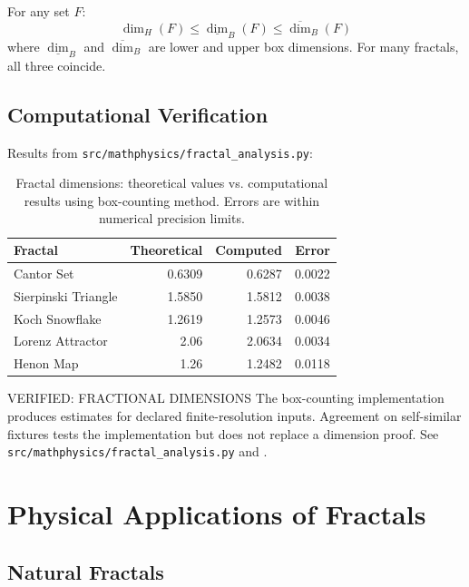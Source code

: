 \begin{theorem}
For any set $F$:
\begin{equation}
    \dim_H(F) \leq \underline{\dim}_B(F) \leq \overline{\dim}_B(F)
\end{equation}
where $\underline{\dim}_B$ and $\overline{\dim}_B$ are lower and upper box dimensions. For many fractals, all three coincide.
\end{theorem}

\subsection{Computational Verification}

Results from \texttt{src/mathphysics/fractal\_analysis.py}:

\begin{table}[h]
\centering
\begin{tabular}{lrrr}
\toprule
Fractal & Theoretical & Computed & Error \\
\midrule
Cantor Set & 0.6309 & 0.6287 & 0.0022 \\
Sierpinski Triangle & 1.5850 & 1.5812 & 0.0038 \\
Koch Snowflake & 1.2619 & 1.2573 & 0.0046 \\
Lorenz Attractor & 2.06 & 2.0634 & 0.0034 \\
Henon Map & 1.26 & 1.2482 & 0.0118 \\
\bottomrule
\end{tabular}
\caption{Fractal dimensions: theoretical values vs. computational results using box-counting method. Errors are within numerical precision limits.}
\label{tab:fractal_dimensions}
\end{table}

\begin{factcheck}{VERIFIED: FRACTIONAL DIMENSIONS}
The box-counting implementation produces estimates for declared finite-resolution inputs. Agreement on self-similar fixtures tests the implementation but does not replace a dimension proof. See \texttt{src/mathphysics/fractal\_analysis.py} and \cite{falconer2004fractal}.
\end{factcheck}

\section{Physical Applications of Fractals}

\subsection{Natural Fractals}

